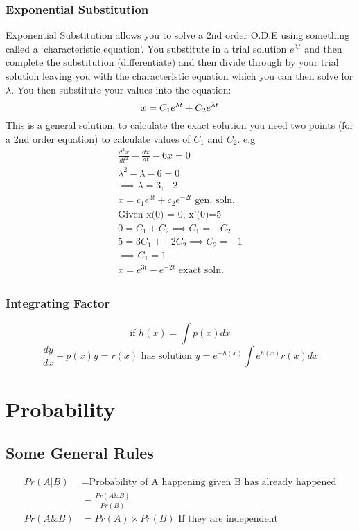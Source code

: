 \documentclass[12pt] {article}
\begin{document}
\subsubsection*{Exponential Substitution}
Exponential Substitution allows you to solve a 2nd order O.D.E using something called
a `characteristic equation'. You substitute in a trial solution $e^{\lambda t}$
and then complete the substitution (differentiate) and then divide through by your 
trial solution leaving you with the characteristic equation which you can then solve for
$\lambda$. You then substitute your values into the equation:
\begin{equation*}
  x=C_1e^{\lambda t} + C_2e^{\lambda t} \\
\end{equation*}
This is a general solution, to calculate the exact solution you need two points 
(for a 2nd order equation) to calculate values of $C_1$ and $C_2$. e.g
\begin{gather*}
  \frac{d^2x}{dt^2} - \frac{dx}{dt} -6x =0 \\
  \lambda^2 - \lambda - 6 = 0\\
  \implies \lambda=3,-2 \\
  x=c_1e^{3t} + c_2e^{-2t} \text{ gen. soln.} \\
  \text{Given x(0) = 0, x'(0)=5} \\
  0 = C_1 + C_2 \implies C_1 = -C_2 \\
  5 = 3C_1 + -2C_2 \implies C_2 = -1 \\
  \implies C_1 = 1 \\
  x=e^{3t} - e^{-2t} \text{ exact soln.} \\
\end{gather*}

\subsubsection*{Integrating Factor}
\begin{equation*}
\text{if } h(x)=\int p(x)dx
\end{equation*}
\begin{equation*}
  \frac{dy}{dx} + p(x)y = r(x) \text{ has solution } y = e^{-h(x)} \int e^{h(x)}r(x)dx
\end{equation*}

\section{Probability}
\subsection*{Some General Rules}
\begin{align*}
  Pr(A \vert B) &= \text{Probability of A happening given B has already happened} \\
                &= \frac{Pr(A\&B)}{Pr(B)} \\
  Pr(A \& B) &= Pr(A) \times Pr(B) \text{ If they are independent}
\end{align*}
\end{document}
